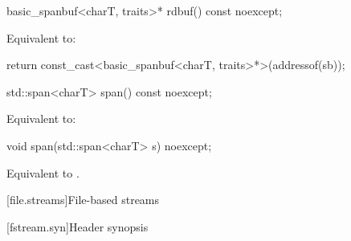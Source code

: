 %
\begin{itemdecl}
basic_spanbuf<charT, traits>* rdbuf() const noexcept;
\end{itemdecl}

\begin{itemdescr}
\pnum
\effects
Equivalent to:
\begin{codeblock}
return const_cast<basic_spanbuf<charT, traits>*>(addressof(sb));
\end{codeblock}
\end{itemdescr}

%
\begin{itemdecl}
std::span<charT> span() const noexcept;
\end{itemdecl}

\begin{itemdescr}
\pnum
\effects
Equivalent to: 
\end{itemdescr}

%
\begin{itemdecl}
void span(std::span<charT> s) noexcept;
\end{itemdecl}

\begin{itemdescr}
\pnum
\effects
Equivalent to .
\end{itemdescr}

[file.streams]{File-based streams}

[fstream.syn]{Header  synopsis}

